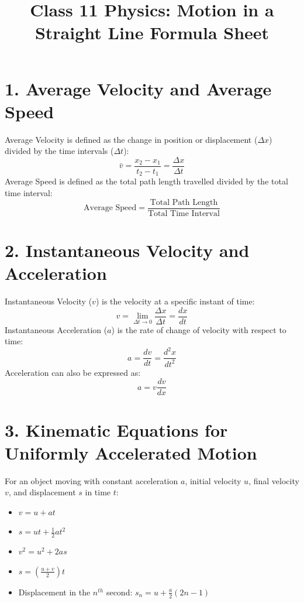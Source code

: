 \documentclass[12pt, a4paper]{article}
\title{Class 11 Physics: Motion in a Straight Line Formula Sheet}
\author{}
\date{}
\begin{document}
\maketitle

\section*{1. Average Velocity and Average Speed}
Average Velocity is defined as the change in position or displacement ($\Delta x$) divided by the time intervals ($\Delta t$):
\[ \bar{v} = \frac{x_2 - x_1}{t_2 - t_1} = \frac{\Delta x}{\Delta t} \]
Average Speed is defined as the total path length travelled divided by the total time interval:
\[ \text{Average Speed} = \frac{\text{Total Path Length}}{\text{Total Time Interval}} \]

\section*{2. Instantaneous Velocity and Acceleration}
Instantaneous Velocity ($v$) is the velocity at a specific instant of time:
\[ v = \lim_{\Delta t \to 0} \frac{\Delta x}{\Delta t} = \frac{dx}{dt} \]
Instantaneous Acceleration ($a$) is the rate of change of velocity with respect to time:
\[ a = \frac{dv}{dt} = \frac{d^2x}{dt^2} \]
Acceleration can also be expressed as:
\[ a = v \frac{dv}{dx} \]

\section*{3. Kinematic Equations for Uniformly Accelerated Motion}
For an object moving with constant acceleration $a$, initial velocity $u$, final velocity $v$, and displacement $s$ in time $t$:
\begin{itemize}
    \item $v = u + at$
    \item $s = ut + \frac{1}{2}at^2$
    \item $v^2 = u^2 + 2as$
    \item $s = \left(\frac{u+v}{2}\right)t$
    \item Displacement in the $n^{th}$ second: $s_n = u + \frac{a}{2}(2n - 1)$
\end{itemize}
\end{document}
